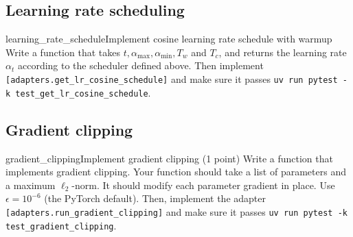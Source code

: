 \subsection{Learning rate scheduling}

\begin{problembox}{learning\_rate\_schedule}{Implement cosine learning rate schedule with warmup}
    Write a function that takes $t, \alpha_{\max}, \alpha_{\min}, T_w$ and $T_c$, and returns the learning rate $\alpha_t$ according to the scheduler defined above. Then implement \texttt{[adapters.get\_lr\_cosine\_schedule]} and make sure it passes \texttt{uv run pytest -k test\_get\_lr\_cosine\_schedule}.
\end{problembox}

\subsection{Gradient clipping}

\begin{problembox}{gradient\_clipping}{Implement gradient clipping \hfill (1 point)}
    Write a function that implements gradient clipping. Your function should take a list of parameters and a maximum $\ell_2$-norm. It should modify each parameter gradient in place. Use $\epsilon = 10^{-6}$ (the PyTorch default). Then, implement the adapter \texttt{[adapters.run\_gradient\_clipping]} and make sure it passes \texttt{uv run pytest -k test\_gradient\_clipping}.
\end{problembox}
